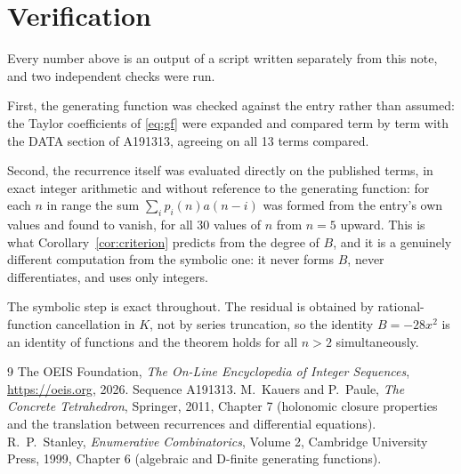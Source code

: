 \documentclass[11pt,a4paper]{article}
\theoremstyle{plain}
\theoremstyle{definition}
\begin{document}
\section{Verification}

Every number above is an output of a script written separately from this note, and two
independent checks were run.

First, the generating function was checked against the entry rather than assumed: the
Taylor coefficients of \eqref{eq:gf} were expanded and compared term by term with the DATA
section of A191313, agreeing on all 13 terms compared.

Second, the recurrence itself was evaluated directly on the published terms, in exact
integer arithmetic and without reference to the generating function: for each $n$ in range
the sum $\sum_{i}p_{i}(n)a(n-i)$ was formed from the entry's own values and found to
vanish, for all 30 values of $n$ from $n=5$ upward. This is what
Corollary~\ref{cor:criterion} predicts from the degree of $B$, and it is a genuinely
different computation from the symbolic one: it never forms $B$, never differentiates, and
uses only integers.

The symbolic step is exact throughout. The residual is obtained by rational-function
cancellation in $K$, not by series truncation, so the identity $B=- 28 x^{2}$ is an
identity of functions and the theorem holds for all $n>2$ simultaneously.

\begin{thebibliography}{9}
 The OEIS Foundation, \emph{The On-Line Encyclopedia of Integer Sequences},
\url{https://oeis.org}, 2026. Sequence A191313.
 M.~Kauers and P.~Paule, \emph{The Concrete Tetrahedron}, Springer, 2011,
Chapter 7 (holonomic closure properties and the translation between recurrences and
differential equations).
 R.~P.~Stanley, \emph{Enumerative Combinatorics}, Volume 2, Cambridge
University Press, 1999, Chapter 6 (algebraic and D-finite generating functions).
\end{thebibliography}
\end{document}
